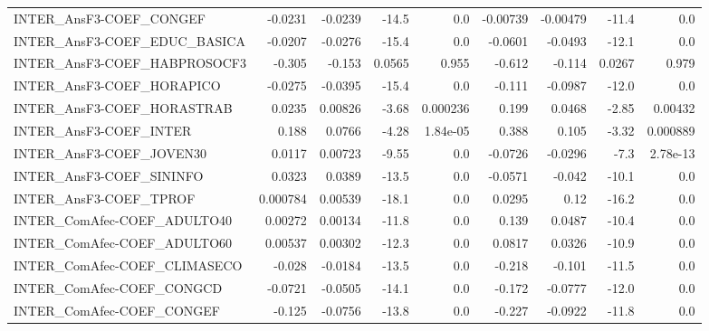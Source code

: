 \begin{tabular}{lrrrrrrrr}
INTER\_AnsF3-COEF\_CONGEF             &     -0.0231 &      -0.0239 &   -14.5 &      0.0 &   -0.00739 &    -0.00479 &        -11.4 &           0.0 \\
INTER\_AnsF3-COEF\_EDUC\_BASICA        &     -0.0207 &      -0.0276 &   -15.4 &      0.0 &    -0.0601 &     -0.0493 &        -12.1 &           0.0 \\
INTER\_AnsF3-COEF\_HABPROSOCF3        &      -0.305 &       -0.153 &  0.0565 &    0.955 &     -0.612 &      -0.114 &       0.0267 &         0.979 \\
INTER\_AnsF3-COEF\_HORAPICO           &     -0.0275 &      -0.0395 &   -15.4 &      0.0 &     -0.111 &     -0.0987 &        -12.0 &           0.0 \\
INTER\_AnsF3-COEF\_HORASTRAB          &      0.0235 &      0.00826 &   -3.68 & 0.000236 &      0.199 &      0.0468 &        -2.85 &       0.00432 \\
INTER\_AnsF3-COEF\_INTER              &       0.188 &       0.0766 &   -4.28 & 1.84e-05 &      0.388 &       0.105 &        -3.32 &      0.000889 \\
INTER\_AnsF3-COEF\_JOVEN30            &      0.0117 &      0.00723 &   -9.55 &      0.0 &    -0.0726 &     -0.0296 &         -7.3 &      2.78e-13 \\
INTER\_AnsF3-COEF\_SININFO            &      0.0323 &       0.0389 &   -13.5 &      0.0 &    -0.0571 &      -0.042 &        -10.1 &           0.0 \\
INTER\_AnsF3-COEF\_TPROF              &    0.000784 &      0.00539 &   -18.1 &      0.0 &     0.0295 &        0.12 &        -16.2 &           0.0 \\
INTER\_ComAfec-COEF\_ADULTO40         &     0.00272 &      0.00134 &   -11.8 &      0.0 &      0.139 &      0.0487 &        -10.4 &           0.0 \\
INTER\_ComAfec-COEF\_ADULTO60         &     0.00537 &      0.00302 &   -12.3 &      0.0 &     0.0817 &      0.0326 &        -10.9 &           0.0 \\
INTER\_ComAfec-COEF\_CLIMASECO        &      -0.028 &      -0.0184 &   -13.5 &      0.0 &     -0.218 &      -0.101 &        -11.5 &           0.0 \\
INTER\_ComAfec-COEF\_CONGCD           &     -0.0721 &      -0.0505 &   -14.1 &      0.0 &     -0.172 &     -0.0777 &        -12.0 &           0.0 \\
INTER\_ComAfec-COEF\_CONGEF           &      -0.125 &      -0.0756 &   -13.8 &      0.0 &     -0.227 &     -0.0922 &        -11.8 &           0.0 \\

\end{tabular}
